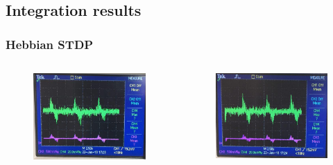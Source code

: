 \documentclass[12pt, aspectratio=169]{beamer}
\begin{document}
\subsection{Integration results}

\begin{frame}
\frametitle{Hebbian STDP}
\begin{columns}[c] %

\begin{figure}
\includegraphics[width=1\linewidth]{mscs_integration_resuts1}
\end{figure}
\begin{figure}
\includegraphics[width=1\linewidth]{mscs_integration_resuts2}
\end{figure}
\end{columns}
\end{frame}
\end{document}
